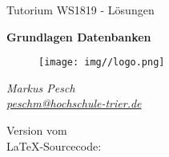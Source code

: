 \begin{titlepage}
  \begin{center}
    \begin{large}
      Tutorium WS1819 - Lösungen
    \end{large}

    \begin{huge}
      \begin{singlespace}
        \textbf{Grundlagen Datenbanken}
      \end{singlespace}
    \end{huge}

    \vspace{0.5cm}

    \begin{figure}[h]
      \centering
      \texttt{[image: img//logo.png]}
      \label{img:fh-trier-logo}
    \end{figure}

    \vspace{2cm}
    \begin{large}
      \textit{Markus Pesch} \\
      \href{mailto:peschm@hochschule-trier.de}{\textit{peschm@hochschule-trier.de}}
    \end{large}
    \vspace{2cm}

    Version  vom  \\
    \LaTeX -Sourcecode: 

  \end{center}
\end{titlepage}
